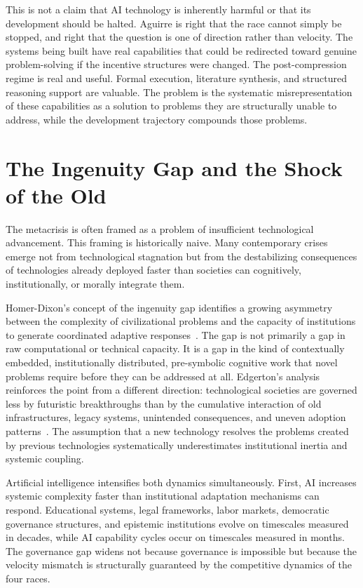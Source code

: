 \documentclass[12pt, a4paper]{article}
\theoremstyle{remark}
\begin{document}
This is not a claim that AI technology is inherently harmful or that its development should be halted. Aguirre is right that the race cannot simply be stopped, and right that the question is one of direction rather than velocity. The systems being built have real capabilities that could be redirected toward genuine problem-solving if the incentive structures were changed. The post-compression regime is real and useful. Formal execution, literature synthesis, and structured reasoning support are valuable. The problem is the systematic misrepresentation of these capabilities as a solution to problems they are structurally unable to address, while the development trajectory compounds those problems.

\section{The Ingenuity Gap and the Shock of the Old}

The metacrisis is often framed as a problem of insufficient technological advancement. This framing is historically naive. Many contemporary crises emerge not from technological stagnation but from the destabilizing consequences of technologies already deployed faster than societies can cognitively, institutionally, or morally integrate them.

Homer-Dixon's concept of the ingenuity gap identifies a growing asymmetry between the complexity of civilizational problems and the capacity of institutions to generate coordinated adaptive responses~\cite{HomerDixon2000}. The gap is not primarily a gap in raw computational or technical capacity. It is a gap in the kind of contextually embedded, institutionally distributed, pre-symbolic cognitive work that novel problems require before they can be addressed at all. Edgerton's analysis reinforces the point from a different direction: technological societies are governed less by futuristic breakthroughs than by the cumulative interaction of old infrastructures, legacy systems, unintended consequences, and uneven adoption patterns~\cite{Edgerton2006}. The assumption that a new technology resolves the problems created by previous technologies systematically underestimates institutional inertia and systemic coupling.

Artificial intelligence intensifies both dynamics simultaneously. First, AI increases systemic complexity faster than institutional adaptation mechanisms can respond. Educational systems, legal frameworks, labor markets, democratic governance structures, and epistemic institutions evolve on timescales measured in decades, while AI capability cycles occur on timescales measured in months. The governance gap widens not because governance is impossible but because the velocity mismatch is structurally guaranteed by the competitive dynamics of the four races.
\end{document}
